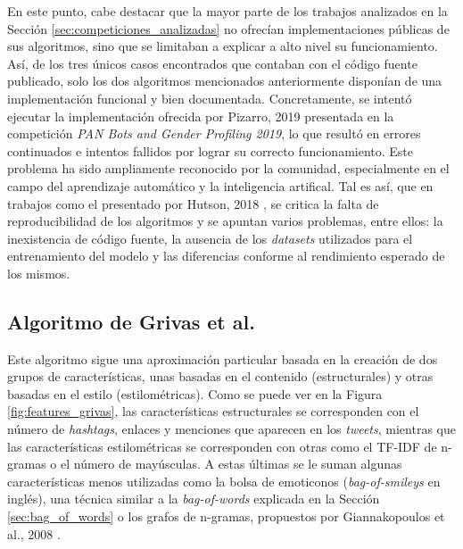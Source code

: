 \bigskip
{En este punto, cabe destacar que la mayor parte de los trabajos analizados en la Sección \ref{sec:competiciones_analizadas} no ofrecían
implementaciones públicas de sus algoritmos, sino que se limitaban a explicar a alto nivel su funcionamiento. Así,
de los tres únicos casos encontrados que contaban con el código fuente publicado, solo los dos algoritmos mencionados anteriormente disponían de
una implementación funcional y bien documentada. Concretamente, se intentó ejecutar la implementación ofrecida por Pizarro, 2019 \cite{pizarro2019using}
presentada en la competición \textit{PAN Bots and Gender Profiling 2019}, lo que resultó en errores continuados e intentos fallidos por lograr su correcto funcionamiento.
Este problema ha sido ampliamente reconocido por la comunidad, especialmente en el campo del aprendizaje automático y la inteligencia artifical.
Tal es así, que en trabajos como el presentado por Hutson, 2018 \cite{hutson2018artificial}, se critica la falta de reproducibilidad de los algoritmos
y se apuntan varios problemas, entre ellos: la inexistencia de código fuente, la ausencia de los \textit{datasets} utilizados para el entrenamiento
del modelo y las diferencias conforme al rendimiento esperado de los mismos.

\subsection{Algoritmo de Grivas et al. \cite{grivas2015author}}

Este algoritmo sigue una aproximación particular basada en la creación de dos grupos de características, unas basadas en el contenido (estructurales) y otras basadas en el estilo (estilométricas).
Como se puede ver en la Figura \ref{fig:features_grivas}, las características estructurales se corresponden con el número de \textit{hashtags}, enlaces y menciones que aparecen en los \textit{tweets},
mientras que las características estilométricas se corresponden con otras como el TF-IDF de n-gramas o el número de mayúsculas. A estas últimas se le suman algunas características menos
utilizadas como la bolsa de emoticonos (\textit{bag-of-smileys} en inglés), una técnica similar a la \textit{bag-of-words} explicada en la Sección \ref{sec:bag_of_words} o los grafos de n-gramas, propuestos
por Giannakopoulos et al., 2008 \cite{giannakopoulos2008summarization}.

}
